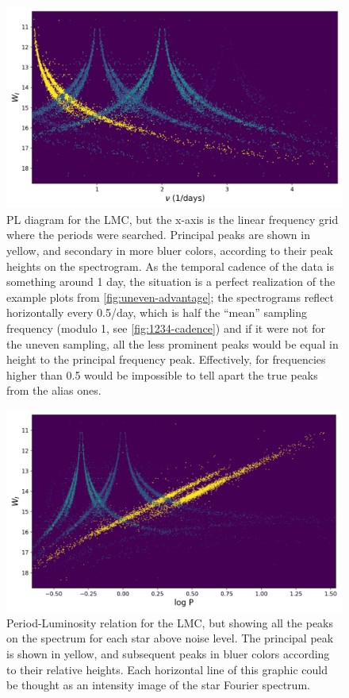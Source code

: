 \begin{figure}
	\centering
	\includegraphics[width=\textwidth]{img/lmc_freq.png}
	\caption[Linear frequency PL relation with secondary peaks for the LMC]{
		PL diagram for the LMC, but the x-axis is the linear frequency grid where the periods were searched.
		Principal peaks are shown in yellow, and secondary in more bluer colors, according to their peak heights on the spectrogram.
		As the temporal cadence of the data is something around 1 day, the situation is a perfect realization of the example plots from \autoref{fig:uneven-advantage};
		the spectrograms reflect horizontally every 0.5/day, which is half the \enquote{mean} sampling frequency (modulo 1, see \autoref{fig:1234-cadence}) and 
		if it were not for the uneven sampling, all the less prominent peaks would be equal in height to the principal frequency peak.
		Effectively, for frequencies higher than 0.5 would be impossible to tell apart the true peaks from the alias ones.
	}
	\label{fig:linear-color-pl-lmc}
\end{figure}

\begin{figure}
	\centering
	\includegraphics[width=\textwidth]{img/lmc.png}
	\caption[PL relation with secondary peaks for the LMC]{
		Period-Luminosity relation for the LMC, but showing all the peaks on the spectrum for each star above noise level. 
		The principal peak is shown in yellow, and subsequent peaks in bluer colors according to their relative heights.
		Each horizontal line of this graphic could be thought as an intensity image of the star Fourier spectrum.
	}
	\label{fig:color-pl-lmc}
\end{figure}


